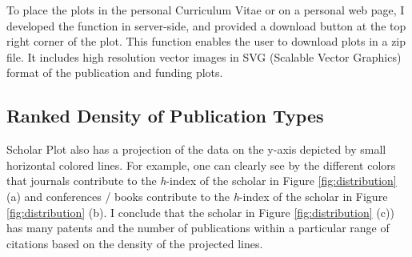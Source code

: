 To place the plots in the personal Curriculum Vitae or on a personal web page, I developed the function in server-side, and provided a download button at the top right corner of the plot. This function enables the user to download plots in a zip file. It includes high resolution vector images in SVG (Scalable Vector Graphics) format of the publication and funding plots.






\subsection*{Ranked Density of Publication Types}
Scholar Plot also has a projection of the data on the y-axis depicted by small horizontal colored lines. For example, one can clearly see by the different colors that journals contribute to the {\it h}-index of the scholar in Figure \ref{fig:distribution} (a) and conferences / books contribute to the {\it h}-index of the scholar in Figure \ref{fig:distribution} (b). I conclude that the scholar in Figure \ref{fig:distribution} (c)) has many patents and the number of publications within a particular range of citations based on the density of the projected lines.


